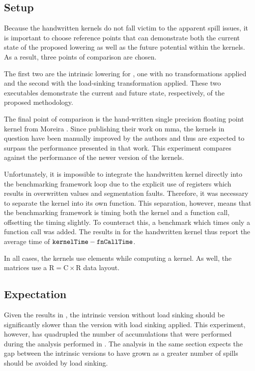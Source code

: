 \documentclass[\main/thesis.tex]{subfiles}
\begin{document}
\subsection{Setup}
Because the handwritten kernels do not fall victim to the apparent spill issues, it is important to choose reference points that can demonstrate both the current state of the proposed lowering as well as the future potential within the kernels.
As a result, three points of comparison are chosen.

The first two are the intrinsic lowering for , one with no transformations applied and the second with the load-sinking transformation applied.
These two executables demonstrate the current and future state, respectively, of the proposed methodology.

The final point of comparison is the hand-written single precision floating point kernel from Moreira \etal.
Since publishing their work on \gls{mma}, the kernels in question have been manually improved by the authors and thus are expected to surpass the performance presented in that work.
This experiment compares against the performance of the newer version of the kernels.

Unfortunately, it is impossible to integrate the handwritten kernel directly into the benchmarking framework loop due to the explicit use of registers which results in overwritten values and segmentation faults.
Therefore, it was necessary to separate the kernel into its own function.
This separation, however, means that the benchmarking framework is timing both the kernel and a function call, offsetting the timing slightly.
To counteract this, a benchmark which times only a function call was added.
The results in  for the handwritten kernel thus report the average time of $\textrm{\code{kernelTime}} - \textrm{\code{fnCallTime}}$.

In all cases, the kernels use  elements while computing a  kernel.
As well, the matrices use a $\textrm{R} = \textrm{C} \times \textrm{R}$ data layout.

\subsection{Expectation}
Given the results in , the intrinsic version without load sinking should be significantly slower than the version with load sinking applied.
This experiment, however, has quadrupled the number of accumulations that were performed during the analysis performed in .
The analysis in the same section expects the gap between the intrinsic versions to have grown as a greater number of spills should be avoided by load sinking.
\end{document}
